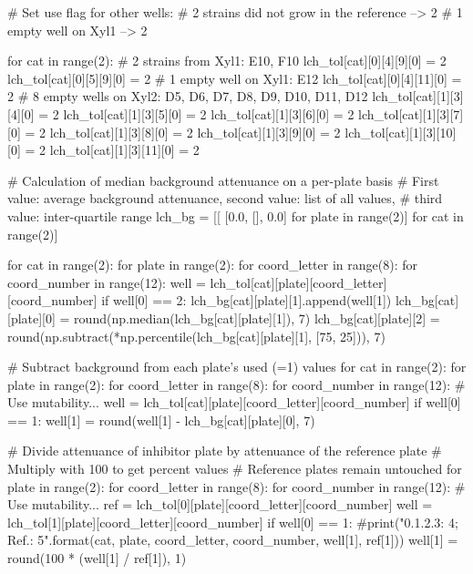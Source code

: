 \begin{pycode}
# Set use flag for other wells:
#    2 strains did not grow in the reference --> 2
#    1 empty well on Xyl1 --> 2

for cat in range(2):
    # 2 strains from Xyl1:      E10, F10
    lch_tol[cat][0][4][9][0] = 2
    lch_tol[cat][0][5][9][0] = 2
    # 1 empty well on Xyl1:     E12
    lch_tol[cat][0][4][11][0] = 2
    # 8 empty wells on Xyl2:    D5, D6, D7, D8, D9, D10, D11, D12
    lch_tol[cat][1][3][4][0]  = 2
    lch_tol[cat][1][3][5][0]  = 2
    lch_tol[cat][1][3][6][0]  = 2
    lch_tol[cat][1][3][7][0]  = 2
    lch_tol[cat][1][3][8][0]  = 2
    lch_tol[cat][1][3][9][0]  = 2
    lch_tol[cat][1][3][10][0] = 2
    lch_tol[cat][1][3][11][0] = 2

# Calculation of median background attenuance on a per-plate basis
# First value: average background attenuance, second value: list of all values,
# third value: inter-quartile range
lch_bg = [[ [0.0, [], 0.0] for plate in range(2)] for cat in range(2)]

for cat in range(2):
    for plate in range(2):
        for coord_letter in range(8):
            for coord_number in range(12):
                well = lch_tol[cat][plate][coord_letter][coord_number]
                if well[0] == 2:
                    lch_bg[cat][plate][1].append(well[1])
        lch_bg[cat][plate][0] = round(np.median(lch_bg[cat][plate][1]), 7)
        lch_bg[cat][plate][2] = round(np.subtract(*np.percentile(lch_bg[cat][plate][1], [75, 25])), 7)

# Subtract background from each plate's used (=1) values
for cat in range(2):
    for plate in range(2):
        for coord_letter in range(8):
            for coord_number in range(12):
                # Use mutability...
                well = lch_tol[cat][plate][coord_letter][coord_number]
                if well[0] == 1:
                    well[1] = round(well[1] - lch_bg[cat][plate][0], 7)

# Divide attenuance of inhibitor plate by attenuance of the reference plate
# Multiply with 100 to get percent values
# Reference plates remain untouched
for plate in range(2):
    for coord_letter in range(8):
        for coord_number in range(12):
            # Use mutability...
            ref = lch_tol[0][plate][coord_letter][coord_number]
            well = lch_tol[1][plate][coord_letter][coord_number]
            if well[0] == 1:
                #print("{0}.{1}.{2}.{3}: {4}; Ref.: {5}".format(cat, plate, coord_letter, coord_number, well[1], ref[1]))
                well[1] = round(100 * (well[1] / ref[1]), 1)


\end{pycode}
